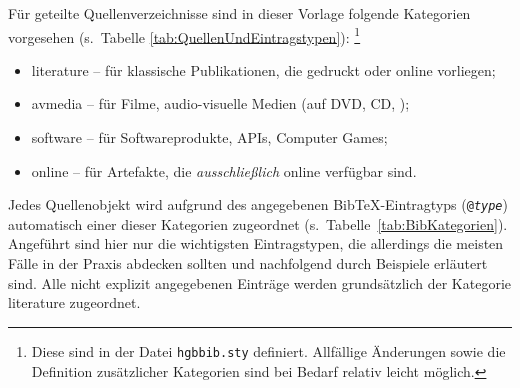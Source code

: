Für geteilte Quellenverzeichnisse sind in dieser Vorlage folgende Kategorien vorgesehen
(s.\ Tabelle \ref{tab:QuellenUndEintragstypen}):%
\footnote{Diese sind in der Datei \nolinkurl{hgbbib.sty} definiert.
Allfällige Änderungen sowie die Definition zusätzlicher Kategorien sind 
bei Bedarf relativ leicht möglich.}
%
\begin{itemize}
	\item[] \textsf{literature} -- für klassische Publikationen, die gedruckt oder online vorliegen;
	\item[] \textsf{avmedia} -- für Filme, audio-visuelle Medien (auf DVD, CD, \usw);
	\item[] \textsf{software} -- für Softwareprodukte, APIs, Computer Games;
	\item[] \textsf{online} -- für Artefakte, die \emph{ausschließlich} online verfügbar sind.
\end{itemize}
%
Jedes Quellenobjekt wird aufgrund des angegebenen BibTeX-Eintragtyps 
(\texttt{@\emph{type}}) automatisch einer dieser Kategorien 
zugeordnet (s.\ Tabelle~\ref{tab:BibKategorien}).
Angeführt sind hier nur die wichtigsten Eintragstypen, die allerdings die meisten
Fälle in der Praxis abdecken sollten und nachfolgend durch Beispiele erläutert sind.
Alle nicht explizit angegebenen Einträge werden grundsätzlich der Kategorie \textsf{literature} 
zugeordnet.

